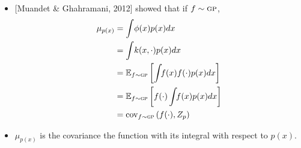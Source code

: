 \documentclass[usenames,dvipsnames]{beamer}
\begin{document}
\begin{frame}[plain, t]
{       		       		
	}
\end{frame}


\begin{frame}[plain, t]
	\titlebodyskip
	

	\slidebody
	{
	\begin{itemize}
		\item \phantom{()} [Muandet \& Ghahramani, 2012] showed that if $f \sim {\textsc{gp}}$,
%
\pause
\begin{align*}
\mu_{p(x)} 	& = \int \! \phi(x) p(x) dx \\
		   	& = \int \! k(x, \cdot) p(x) dx \\
			& = \mathbb{E}_{f \sim {\textsc{gp}}} \left[ { \int \!\! f(x) f(\cdot) p(x) dx} \right] \\
			& = \mathbb{E}_{f \sim {\textsc{gp}}} \left[ { f(\cdot) \int \!\! f(x) p(x) dx} \right] \\
			& = \operatorname{cov}_{f \sim {\textsc{gp}}}\left( f(\cdot), Z_p \right)	
\end{align*}
%
\pause
\item $\mu_{p(x)}$ is the covariance the function with its integral with respect to $p(x)$.
	\end{itemize}	
}
\end{frame}
\end{document}
